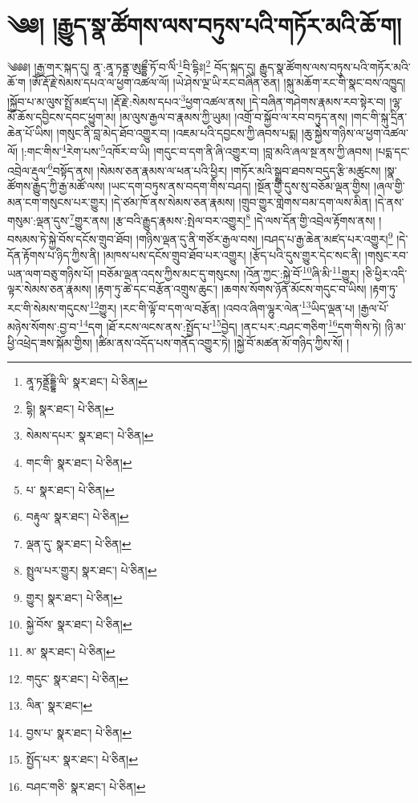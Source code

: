\setcounter{footnote}{0} 
\chapter{༄༅། །རྒྱུད་སྣ་ཚོགས་ལས་བཏུས་པའི་གཏོར་མའི་ཆོ་ག།}༄༅༅། །རྒྱ་གར་སྐད་དུ། ནཱ་:ནཱ་ཏནྟྲ་ཨུདྡྷྲྀ་ཏོ་བ་ལིཾ་\footnote{ནཱ་ཏནྡྲོདྡྷི་ལི་  སྣར་ཐང་།  པེ་ཅིན། }བི་དྷིཿ།\footnote{དྷི།  སྣར་ཐང་།  པེ་ཅིན། } བོད་སྐད་དུ། རྒྱུད་སྣ་ཚོགས་ལས་བཏུས་པའི་གཏོར་མའི་ཆོ་ག །ཨོཾ་རྡོ་རྗེ་སེམས་དཔའ་ལ་ཕྱག་འཚལ་ལོ། །ཡེ་ཤེས་ལྔ་ཡི་རང་བཞིན་ཅན། །སྐུ་མཆོག་རང་གི་སྣང་བས་འཁྱུད། །སྐྱོབ་པ་མ་ལུས་སྤྲོ་མཛད་པ། །རྡོ་རྗེ་:སེམས་དཔའ་\footnote{སེམས་དཔར་  སྣར་ཐང་།  པེ་ཅིན། }ཕྱག་འཚལ་ནས། །དེ་བཞིན་གཤེགས་རྣམས་རབ་སྟེར་བ། །ལྷ་མོ་ཆོས་དབྱིངས་དབང་ཕྱུག་མ། །མ་ལུས་རྒྱལ་བ་རྣམས་ཀྱི་ཡུམ། །འགྲོ་བ་སྐྱོབ་ལ་རབ་བཏུད་ནས། །གང་གི་སྐུ་དྲིན་ཆེན་པོ་ཡིས། །གསུང་ནི་བླ་མེད་ཐོབ་འགྱུར་བ། །འཇམ་པའི་དབྱངས་ཀྱི་ཞབས་པདྨ། །ཆུ་སྐྱེས་གཉིས་ལ་ཕྱག་འཚལ་ལོ། །:གང་གིས་\footnote{གང་གི་  སྣར་ཐང་།  པེ་ཅིན། }རེག་པས་\footnote{པ་  སྣར་ཐང་།  པེ་ཅིན། }འཁོར་བ་ཡི། །གདུང་བ་དག་ནི་ཞི་འགྱུར་བ། །བླ་མའི་ཞལ་སྔ་ནས་ཀྱི་ཞབས། །པདྨ་དང་འབྲེལ་རྡུལ་\footnote{བརྟུལ་  སྣར་ཐང་།  པེ་ཅིན། }བསྟོད་ནས། །སེམས་ཅན་རྣམས་ལ་ཕན་པའི་ཕྱིར། །གཏོར་མའི་སྒྲུབ་ཐབས་བདུད་རྩི་མཚུངས། །སྣ་ཚོགས་རྒྱུད་ཀྱི་རྒྱ་མཚོ་ལས། །ཡང་དག་བཏུས་ནས་བདག་གིས་བཤད། །སྔོན་གྱི་དུས་སུ་བཅོམ་ལྡན་གྱིས། །ཞལ་གྱི་མན་ངག་གསུངས་པར་གྱུར། །དེ་ཙམ་ཁོ་ནས་སེམས་ཅན་རྣམས། །གྲུབ་གྱུར་གླེགས་བམ་དག་ལས་མིན། །དེ་ནས་གསུམ་:ལྡན་དུས་\footnote{ལྡན་དུ་  སྣར་ཐང་།  པེ་ཅིན། }གྱུར་ནས། །རྩ་བའི་རྒྱུད་རྣམས་:སྤེལ་བར་འགྱུར།\footnote{སྤྲུལ་པར་གྱུར།  སྣར་ཐང་།  པེ་ཅིན། } །དེ་ལས་དོན་གྱི་འབྲེལ་རྟོགས་ནས། །བསམས་ཏེ་སྐྱེ་བོས་དངོས་གྲུབ་ཐོབ། །གཉིས་ལྡན་དུ་ནི་གཙོར་རྒྱལ་བས། །བཤད་པ་རྒྱ་ཆེན་མཛད་པར་འགྱུར།\footnote{གྱུར།  སྣར་ཐང་།  པེ་ཅིན། } །དེ་དོན་རྟོགས་པ་ཉིད་ཀྱིས་ནི། །མཁས་པས་དངོས་གྲུབ་ཐོབ་པར་འགྱུར། །རྩོད་པའི་དུས་གྱུར་དེང་སང་ནི། །གསུང་རབ་ཡན་ལག་བཅུ་གཉིས་པོ། །བཅོམ་ལྡན་འདས་ཀྱིས་མང་དུ་གསུངས། །འོན་ཀྱང་:སྐྱེ་བོ་\footnote{སྐྱེ་བོས་  སྣར་ཐང་།  པེ་ཅིན། }ཞི་མི་\footnote{མ་  སྣར་ཐང་།  པེ་ཅིན། }གྱུར། །ཅི་ཕྱིར་འདི་ལྟར་སེམས་ཅན་རྣམས། །རྟག་ཏུ་ཚེ་དང་བརྩོན་འགྲུས་ཆུང་། །ཆགས་སོགས་ཉོན་མོངས་གདུང་བ་ཡིས། །རྟག་ཏུ་རང་གི་སེམས་གདུངས་\footnote{གདུང་  སྣར་ཐང་།  པེ་ཅིན། }གྱུར། །རང་གི་ལྟོ་བ་དག་ལ་བརྩོན། །འབའ་ཞིག་ལྷུར་ལེན་\footnote{ལིན་  སྣར་ཐང་། }ཡིད་ལྡན་པ། །རྒྱལ་པོ་མཉེས་སོགས་:བྱ་བ་\footnote{བྱས་པ་  སྣར་ཐང་།  པེ་ཅིན། }དག །ཐོ་རངས་ལངས་ནས་:སྤྱོད་པ་\footnote{སྤྱོད་པར་  སྣར་ཐང་།  པེ་ཅིན། }བྱེད། །ནང་པར་:བཤང་གཅིག་\footnote{བཤང་གཅི་  སྣར་ཐང་།  པེ་ཅིན། }དག་གིས་ཏེ། །ཉི་མ་ཕྱི་འཕྲེད་ཟས་སྐོམ་གྱིས། །ཚིམ་ནས་འདོད་པས་གནོད་འགྱུར་ཏེ། །སྐྱེ་བོ་མཚན་མོ་གཉིད་ཀྱིས་སོ། །
